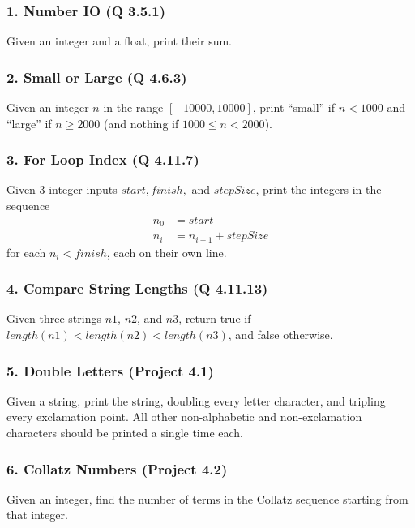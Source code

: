 \documentclass{sig-alternate}
\begin{document}
\subsubsection*{1. Number IO (Q 3.5.1)}
Given an integer and a float, print their sum.

\subsubsection*{2. Small or Large (Q 4.6.3)}
Given an integer $n$ in the range $[-10000, 10000]$, print ``small'' if $n < 1000$ and ``large'' if $n \ge 2000$ (and nothing if $1000 \le n < 2000$).

\subsubsection*{3. For Loop Index (Q 4.11.7)}
Given 3 integer inputs $start, finish,$ and $stepSize$, print the integers in the sequence
\begin{align*}
n_0 &= start \\
n_i &= n_{i-1} + stepSize
\end{align*}
for each $n_i < finish$, each on their own line.


\subsubsection*{4. Compare String Lengths (Q 4.11.13)}
Given three strings $n1$, $n2$, and $n3$, return true if $length(n1) < length(n2) < length(n3)$, and false otherwise.

\subsubsection*{5. Double Letters (Project 4.1)}
Given a string, print the string, doubling every letter character, and tripling every exclamation point. All other non-alphabetic and non-exclamation characters should be printed a single time each.

\subsubsection*{6. Collatz Numbers (Project 4.2)}
Given an integer, find the number of terms in the Collatz sequence starting from that integer.
\end{document}
